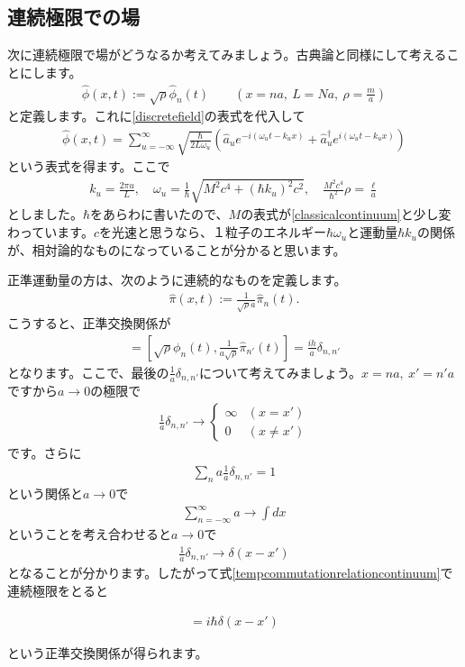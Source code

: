 \documentclass[report,paper=a4, fontsize=12pt, line_length=16cm, number_of_lines=33,dvipdfmx]{jlreq}
\newenvironment{important}{\begin{tcolorbox}[
  colback = white,
  colframe = red!35,
  boxrule = 2mm,
  fonttitle = \bfseries,
  after = \noindent] }{\end{tcolorbox}}
\numberwithin{equation}{chapter}
\newcommand{\phih}{\hat{\phi}}
\newcommand{\pih}{\hat{\pi}}
\newcommand{\ah}{\hat{a}}
\begin{document}
\subsection{連続極限での場}
次に連続極限で場がどうなるか考えてみましょう。古典論と同様にして考えることにします。
\begin{align}
  \phih(x,t):=\sqrt{\rho}\phih_{n}(t)\qquad (x=na,\ L=Na,\ \rho=\frac{m}{a})
\end{align}
と定義します。これに\eqref{discretefield}の表式を代入して
\begin{align}
  \phih(x,t)=\sum_{u=-\infty}^{\infty}\sqrt{\frac{\hbar}{2L\omega_{u}}}(\ah_{u}e^{-i(\omega_ut-k_ux)}
  +\ah^{\dag}_{u}e^{i(\omega_ut-k_ux)})
\end{align}
という表式を得ます。ここで
\begin{align}
  k_u=\frac{2\pi u}{L},\quad \omega_{u}=\frac{1}{\hbar}\sqrt{M^2c^4+(\hbar k_u)^2c^2},\quad \frac{M^2c^4}{\hbar^2}\rho=\frac{\ell}{a}
\end{align}
としました。$\hbar$をあらわに書いたので、$M$の表式が\eqref{classicalcontinuum}と少し変わっています。$c$を光速と思うなら、１粒子のエネルギー$\hbar \omega_{u}$と運動量$\hbar k_u$の関係が、相対論的なものになっていることが分かると思います。

正準運動量の方は、次のように連続的なものを定義します。
\begin{align}
  \pih(x,t):=\frac{1}{\sqrt{\rho}a}\pih_{n}(t).
\end{align}
こうすると、正準交換関係が
\begin{align}
  [\phih(x,t),\pih(x',t)]=[\sqrt{\rho}\phi_{n}(t),\frac{1}{a\sqrt{\rho}}\pih_{n'}(t)]=\frac{ih}{a}\delta_{n,n'}
  \label{tempcommutationrelationcontinuum}
\end{align}
となります。ここで、最後の$\frac{1}{a}\delta_{n,n'}$について考えてみましょう。$x=na,\ x'=n'a$ですから$a\to 0$の極限で
\begin{align}
  \frac{1}{a}\delta_{n,n'}\to
  \begin{cases}
    \infty & (x=x')\\
    0 & (x\ne x')
  \end{cases}
\end{align}
です。さらに
\begin{align}
  \sum_{n}a \frac{1}{a}\delta_{n,n'}=1
\end{align}
という関係と$a\to 0$で
\begin{align}
  \sum_{n=-\infty}^{\infty}a\to \int dx
\end{align}
ということを考え合わせると$a\to 0$で
\begin{align}
  \frac{1}{a}\delta_{n,n'}\to \delta(x-x')
\end{align}
となることが分かります。したがって式\eqref{tempcommutationrelationcontinuum}で連続極限をとると
\begin{important}
  \begin{align}
    [\phih(x,t),\pih(x',t)]=i\hbar\delta(x-x')
  \end{align}
\end{important}
という正準交換関係が得られます。
\end{document}
